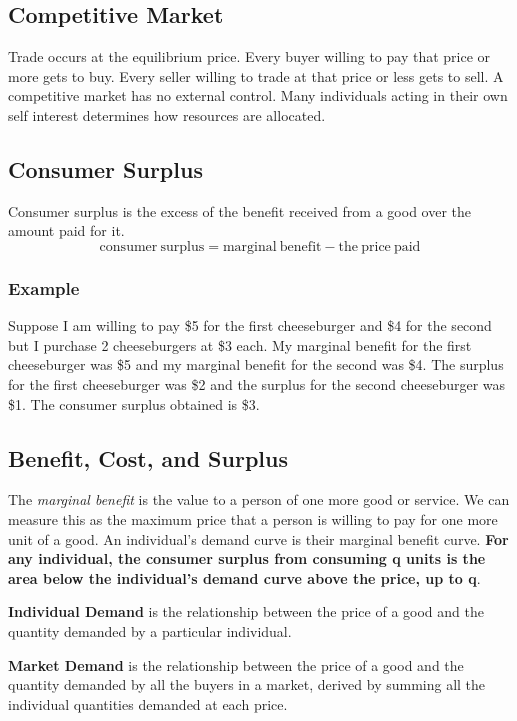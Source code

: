 \documentclass[letterpaper, 12pt]{article}
\begin{document}
\subsection{Competitive Market}
Trade occurs at the equilibrium price. Every buyer willing to pay that price
or more gets to buy. Every seller willing to trade at that price or less
gets to sell. A competitive market has no external control. Many individuals
acting in their own self interest determines how resources are allocated.

\subsection{Consumer Surplus}
Consumer surplus is the excess of the benefit received from a good over the
amount paid for it.
\[ \mathrm{consumer\ surplus} = \mathrm{marginal\ benefit}-
   \mathrm{the\ price\ paid} \]

\subsubsection{Example}
Suppose I am willing to pay \$5 for the first cheeseburger and \$4 for the
second but I purchase 2 cheeseburgers at \$3 each. My marginal benefit for the
first cheeseburger was \$5 and my marginal benefit for the second was \$4. The
surplus for the first cheeseburger was \$2 and the surplus for the second
cheeseburger was \$1. The consumer surplus obtained is \$3.

\subsection{Benefit, Cost, and Surplus}
The \textit{marginal benefit} is the value to a person of one more good or
service. We can measure this as the maximum price that a person is willing to
pay for one more unit of a good. An individual's demand curve is their marginal
benefit curve. \textbf{For any individual, the consumer surplus from consuming
q units is the area below the individual's demand curve above the price, up to
q}. \par
\textbf{Individual Demand} is the relationship between the price of a good and
the quantity demanded by a particular individual. \par
\textbf{Market Demand} is the relationship between the price of a good and the
quantity demanded by all the buyers in a market, derived by summing all the
individual quantities demanded at each price.
\end{document}
